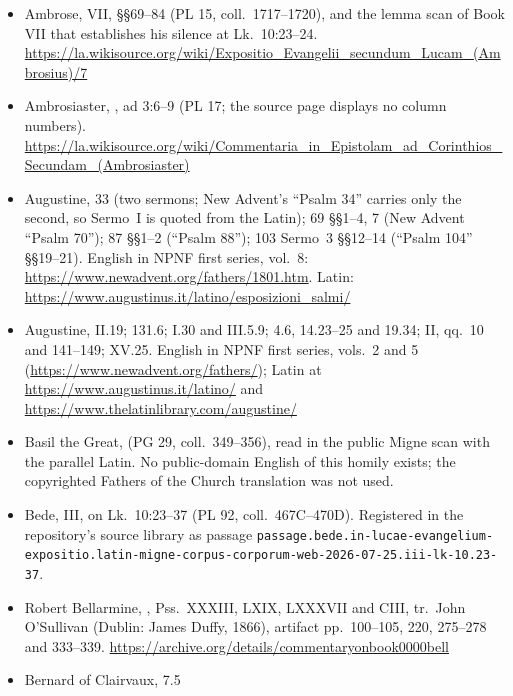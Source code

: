 \begin{itemize}[leftmargin=1.2em, itemsep=0.15em]
\item Ambrose,  VII, §§69--84 (PL 15,
coll.\ 1717--1720), and the lemma scan of Book VII that establishes his
silence at Lk.\ 10:23--24.
\url{https://la.wikisource.org/wiki/Expositio_Evangelii_secundum_Lucam_(Ambrosius)/7}
\item Ambrosiaster, , ad
3:6--9 (PL 17; the source page displays no column numbers).
\url{https://la.wikisource.org/wiki/Commentaria_in_Epistolam_ad_Corinthios_Secundam_(Ambrosiaster)}
\item Augustine,  33 (two sermons; New Advent's
``Psalm 34'' carries only the second, so Sermo~I is quoted from the Latin);
69 §§1--4, 7 (New Advent ``Psalm 70''); 87 §§1--2 (``Psalm 88''); 103 Sermo~3
§§12--14 (``Psalm 104'' §§19--21). English in NPNF first series, vol.~8:
\url{https://www.newadvent.org/fathers/1801.htm}. Latin:
\url{https://www.augustinus.it/latino/esposizioni_salmi/}
\item Augustine,  II.19;  131.6;
 I.30 and III.5.9; 
4.6, 14.23--25 and 19.34;  II, qq.\ 10 and
141--149;  XV.25. English in NPNF first series, vols.\ 2
and 5 (\url{https://www.newadvent.org/fathers/}); Latin at
\url{https://www.augustinus.it/latino/} and
\url{https://www.thelatinlibrary.com/augustine/}
\item Basil the Great,  (PG 29, coll.\ 349--356),
read in the public Migne scan with the parallel Latin. No public-domain English
of this homily exists; the copyrighted Fathers of the Church translation was
not used.
\item Bede,  III, on Lk.\ 10:23--37
(PL 92, coll.\ 467C--470D). Registered in the repository's source library as
passage
\nolinkurl{passage.bede.in-lucae-evangelium-expositio.latin-migne-corpus-corporum-web-2026-07-25.iii-lk-10.23-37}.
\item Robert Bellarmine, , Pss.\ XXXIII, LXIX,
LXXXVII and CIII, tr.\ John O'Sullivan (Dublin: James Duffy, 1866), artifact
pp.\ 100--105, 220, 275--278 and 333--339.
\url{https://archive.org/details/commentaryonbook0000bell}
\item Bernard of Clairvaux,  7.5

\end{itemize}
